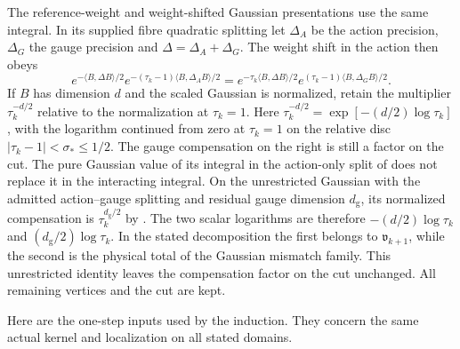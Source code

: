 \documentclass[11pt,letterpaper,reqno]{amsart}
\numberwithin{equation}{section}
\theoremstyle{definition}
\theoremstyle{remark}
\begin{document}
The reference-weight and weight-shifted Gaussian presentations use the
same integral. In its supplied fibre quadratic splitting let
$\Delta_A$ be the action precision, $\Delta_G$ the gauge precision and
$\Delta=\Delta_A+\Delta_G$. The weight shift in the action then obeys
\begin{equation}\label{em:eq-frozen-gaussian-rewrite}
 e^{-\langle B,\Delta B\rangle/2}
 e^{-(\tau_k-1)\langle B,\Delta_A B\rangle/2}
 =e^{-\tau_k\langle B,\Delta B\rangle/2}
  e^{(\tau_k-1)\langle B,\Delta_G B\rangle/2}.
\end{equation}
If $B$ has dimension $d$ and the scaled Gaussian is normalized,
retain the multiplier $\tau_k^{-d/2}$ relative to the normalization
at $\tau_k=1$. Here $\tau_k^{-d/2}=\exp[-(d/2)\log\tau_k]$,
with the logarithm continued from zero at $\tau_k=1$ on the
relative disc $|\tau_k-1|<\sigma_*\le1/2$. The gauge compensation on the
right is still a factor on the cut. The pure Gaussian value of its
integral in the action-only split of \cite{GI} does not replace it in
the interacting integral. On the unrestricted Gaussian with the
admitted action--gauge splitting and residual gauge dimension
$d_{\mathrm g}$, its normalized compensation is
$\tau_k^{d_{\mathrm g}/2}$ by \cite[Proposition~4.3]{GI}. The two
scalar logarithms are therefore $-(d/2)\log\tau_k$ and
$(d_{\mathrm g}/2)\log\tau_k$. In the stated decomposition the
first belongs to $\mathfrak v_{k+1}$, while the second is the
physical total of the Gaussian mismatch family. This unrestricted identity leaves
the compensation factor on the cut unchanged. All remaining
vertices and the cut are kept.

Here are the one-step inputs used by the induction. They concern the
same actual kernel and localization on all stated domains.
\end{document}
